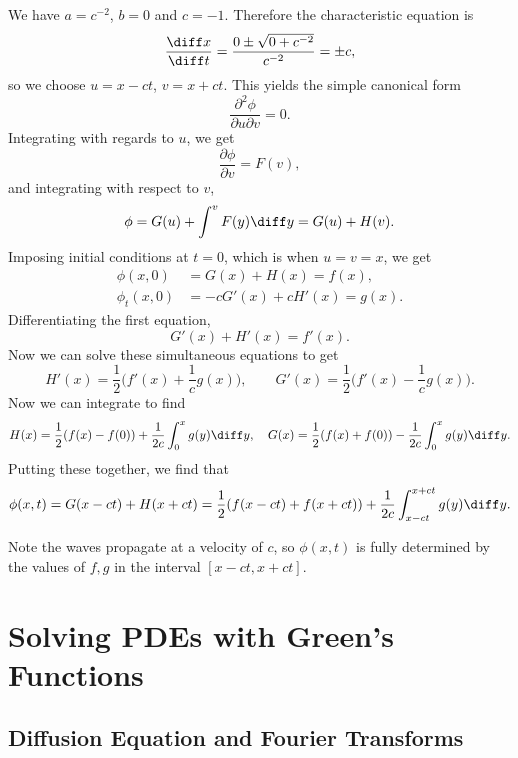 \documentclass[12pt]{article}
\begin{document}
We have $a = c^{-2}$, $b = 0$ and $c = -1$. Therefore the characteristic equation is
\[
	\frac{\diff x}{\diff t}= \frac{0 \pm \sqrt{0 + c^{-2}}}{c^{-2}} = \pm c
,\]
so we choose $u = x - ct$, $v = x + ct$. This yields the simple canonical form
\[
\frac{\partial^2 \phi}{\partial u \partial v} = 0
.\]
Integrating with regards to $u$, we get
\[
	\frac{\partial \phi}{\partial v} = F(v)
,\]
and integrating with respect to $v$,
\[
	\phi = G(u) + \int^{v} F(y) \diff y = G(u) + H(v)
.\]
Imposing initial conditions at $t = 0$, which is when $u = v = x$, we get
\begin{align*}
	\phi(x, 0) &= G(x) + H(x) = f(x), \\
	\phi_t(x, 0) &= -c G'(x) + c H'(x) = g(x).
\end{align*}
Differentiating the first equation,
\[
	G'(x) + H'(x) = f'(x)
.\]
Now we can solve these simultaneous equations to get
\[
H'(x) = \frac{1}{2} \biggl(f'(x) + \frac{1}{c}g(x) \biggr), \qquad G'(x) = \frac{1}{2}\biggl(f'(x) - \frac{1}{c} g(x) \biggr)
.\]
Now we can integrate to find
\[
	H(x) = \frac{1}{2}(f(x) - f(0)) + \frac{1}{2c} \int_{0}^{x}g(y) \diff y, \quad G(x) = \frac{1}{2}(f(x) + f(0)) - \frac{1}{2c} \int_{0}^{x} g(y) \diff y
.\]
Putting these together, we find that
\[
	\phi(x, t) = G(x - ct) + H(x + ct) = \frac{1}{2}(f(x - ct) + f(x + ct)) + \frac{1}{2c} \int_{x-ct}^{x+ct}g(y) \diff y
.\]

Note the waves propagate at a velocity of $c$, so $\phi(x, t)$ is fully determined by the values of $f, g$ in the interval $[x-ct, x+ct]$.

\newpage

\section{Solving PDEs with Green's Functions}%
\label{sec:solving_pdes_with_green_s_functions}

\subsection{Diffusion Equation and Fourier Transforms}%
\label{sub:diffusion_equation_and_fourier_transforms}
\end{document}
